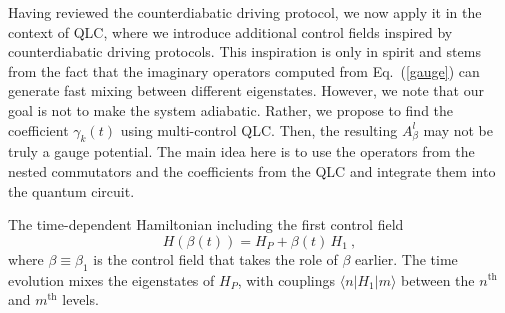 \documentclass[twocolumn,aps,superscriptaddress,floatfix,longbibliography]{revtex4-2}
\begin{document}

Having reviewed the counterdiabatic driving protocol, we now apply it in the context of QLC, where we introduce additional control fields inspired by counterdiabatic driving protocols.  This inspiration is only in spirit and stems from the fact that the imaginary operators computed from Eq.~(\ref{gauge}) can generate fast mixing between different eigenstates. However, we note that our goal is not to make the system adiabatic. Rather, we propose to find the coefficient $\gamma_{k}(t)$ using multi-control QLC. Then, the resulting $A_{\beta}^{l}$ may not be truly a gauge potential. The main idea here is to use the operators from the nested commutators and the coefficients from the QLC and integrate them into the quantum circuit. 


The time-dependent Hamiltonian including the first control field 
\begin{equation}
   H(\beta(t)) %
   = H_P+\beta(t) \,H_1 \ ,
\label{Ham-one}
\end{equation}
where $\beta \equiv \beta_1$ is the control field that takes the
role of $\beta$ earlier. The time evolution mixes the
eigenstates of $H_P$, with couplings $\langle n|H_1|m\rangle$
between the $n^{\text{th}}$ and $m^{\text{th}}$ levels. 
\end{document}

